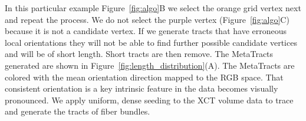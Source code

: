  In this particular example Figure~\ref{fig:algo}B we select the orange grid vertex next and repeat the process. We do not select the purple vertex (Figure~\ref{fig:algo}C) because it is not a candidate vertex. If we generate tracts that have erroneous local orientations they will not be able to find further possible candidate vertices and will be of short length. Short tracts are then remove. The MetaTracts generated are shown in Figure~\ref{fig:length_distribution}(A). The MetaTracts are colored with the mean orientation direction mapped to the RGB space. That consistent orientation is a key intrinsic feature in the data becomes visually pronounced.
 We apply uniform, dense seeding to the XCT volume data to trace and generate the tracts of fiber bundles. 
 
 
%
 


